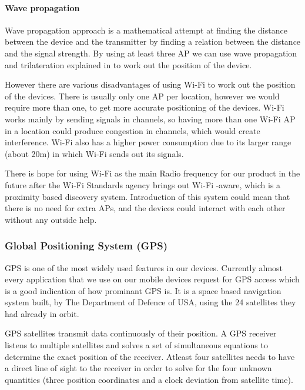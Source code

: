 \paragraph{Wave propagation}
Wave propagation approach is a mathematical attempt at finding the
distance between the device and the transmitter by finding a relation
between the distance and the signal strength. By using at least three
AP we can use wave propagation and trilateration explained in  to work out the position
of the device. 

However there are various disadvantages of using Wi-Fi to work out
the position of the devices. There is usually only one AP per location,
however we would require more than one, to get more accurate positioning
of the devices. Wi-Fi works mainly by sending signals in channels,
so having more than one Wi-Fi AP in a location could produce congestion
in channels, which would create interference. Wi-Fi also has a higher
power consumption due to its larger range (about 20m) in which Wi-Fi sends
out its signals\cite{wifi-wikipedia}. 

There is hope for using Wi-Fi as the main Radio frequency for our
product in the future after the Wi-Fi Standards agency brings out
Wi-Fi -aware, which is a proximity based discovery system. Introduction
of this system could mean that there is no need for extra  APs, and the devices could interact with each other without any
outside help. 


\subsubsection{Global Positioning System (GPS)}

GPS is one of the most widely used features in our devices. Currently almost every application that
we use on our mobile devices request for GPS access which is a good indication of
how prominant GPS is. It is a space based navigation system built, by The Department of Defence of USA, using the 24 satellites they had already in orbit\cite{gps_basics}. 

GPS satellites transmit data continuously of their position. A GPS receiver listens to multiple satellites and
solves a set of simultaneous equations to determine the exact position of the receiver. Atleast four satellites needs to have a direct line of sight to the receiver in order to solve for the four unknown quantities
(three position coordinates and a clock deviation from satellite time). 

